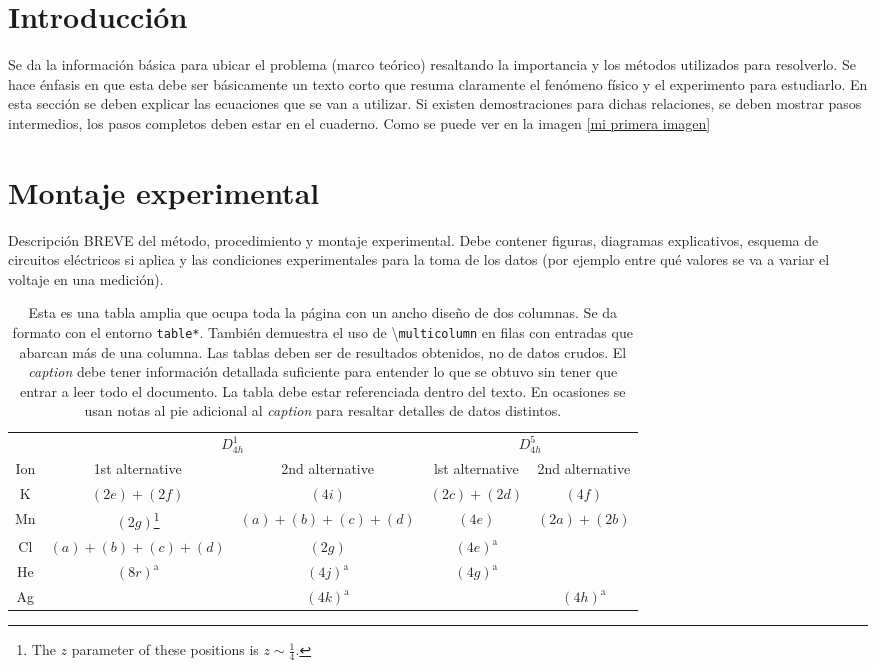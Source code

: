 \documentclass[a4paper, amsfonts, amssymb, amsmath, reprint, showkeys, nofootinbib, twoside]{revtex4-1}
\begin{document}
\section{Introducción}

Se da la información básica para ubicar el problema (marco teórico) resaltando la importancia y los métodos utilizados para resolverlo. Se hace énfasis en que esta debe ser básicamente un texto corto que resuma claramente el fenómeno físico y el experimento para estudiarlo. En esta  sección se deben explicar las ecuaciones que se van a utilizar. Si existen demostraciones para dichas relaciones, se deben mostrar pasos intermedios, los pasos completos deben estar en el cuaderno.
Como se puede ver en la imagen \ref{mi primera imagen}


 


\section{Montaje experimental}

Descripción BREVE del método, procedimiento y montaje  experimental. Debe contener figuras, diagramas explicativos, esquema de circuitos eléctricos si aplica y las condiciones experimentales para la toma de los datos (por ejemplo entre qué valores se va a variar el voltaje en una medición). 


\begin{table*}
\caption{\label{tab:table3}Esta es una tabla amplia que ocupa toda la página con un ancho diseño de dos columnas. Se da formato con el entorno \texttt{table*}. También demuestra el uso de \textbackslash \texttt{multicolumn} en filas con entradas que abarcan
más de una columna. Las tablas deben ser de resultados obtenidos, no de datos crudos. El \emph{caption} debe tener información detallada suficiente para entender lo que se obtuvo sin tener que entrar a leer todo el documento. La tabla debe estar referenciada dentro del texto. En ocasiones se usan notas al pie adicional al \emph{caption} para resaltar detalles de datos distintos.}
\begin{ruledtabular}
\begin{tabular}{ccccc}
&\multicolumn{2}{c}{$D_{4h}^1$}&\multicolumn{2}{c}{$D_{4h}^5$}\\
Ion&1st alternative&2nd alternative&lst alternative
&2nd alternative\\ \hline
K&$(2e)+(2f)$&$(4i)$ &$(2c)+(2d)$&$(4f)$ \\
Mn&$(2g)$\footnote{The $z$ parameter of these positions is $z\sim\frac{1}{4}$.}
&$(a)+(b)+(c)+(d)$&$(4e)$&$(2a)+(2b)$\\
Cl&$(a)+(b)+(c)+(d)$&$(2g)$\footnotemark[1]
&$(4e)^{\text{a}}$\\
He&$(8r)^{\text{a}}$&$(4j)^{\text{a}}$&$(4g)^{\text{a}}$\\
Ag& &$(4k)^{\text{a}}$& &$(4h)^{\text{a}}$\\
\end{tabular}
\end{ruledtabular}
\end{table*}
\end{document}
